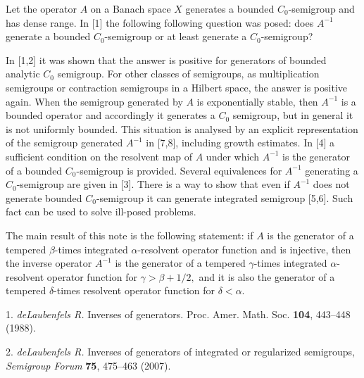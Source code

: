 


\vzmscaption


Let the operator $A$ on a Banach space $X$ generates a bounded $C_0$-semigroup
and has dense range. In [1] the following following question was posed: does
$A^{-1}$ generate a bounded $C_0$-semigroup or at least generate a $C_0$-semigroup?

In [1,2] it was shown  that the answer is positive for generators of bounded
analytic $C_0$ semigroup.  For other classes of semigroups, as multiplication
semigroups or contraction semigroups in a Hilbert space, the answer is positive again.
When the semigroup generated by $A$ is exponentially stable, then $A^{-1}$ is a
bounded operator and accordingly it generates a  $C_0$ semigroup, but in general
it is not uniformly bounded. This situation is analysed by an explicit representation
of the semigroup generated $A^{-1}$ in [7,8], including growth estimates.
In [4] a sufficient condition on the resolvent map of $A$ under which $A^{-1}$
is the generator of a bounded  $C_0$-semigroup is provided. Several equivalences
for $A^{-1}$ generating a $C_0$-semigroup are given in [3]. There is a way to
show that even if $A^{-1}$ does not generate bounded $C_0$-semigroup it can generate
integrated semigroup [5,6]. Such fact can be used to solve ill-posed problems.

The main result of this note is  the following statement: if $A$ is the generator
of a tempered $\beta$-times integrated $\alpha$-resolvent operator function and
is injective, then the inverse operator $A^{-1}$ is the generator of a tempered
$\gamma$-times integrated $\alpha$-resolvent operator function for
$\gamma > \beta+1/2,$ and it is also the generator of a tempered $\delta$-times
resolvent operator function for $\delta < \alpha.$






\litlist

1. {\it  deLaubenfels R.} Inverses of generators. Proc. Amer. Math. Soc. \textbf{104}, 443--448 (1988).

2. {\it  deLaubenfels R.} Inverses of generators of integrated or regularized semigroups,
\emph{Semigroup Forum} \textbf{75}, 475--463  (2007).

